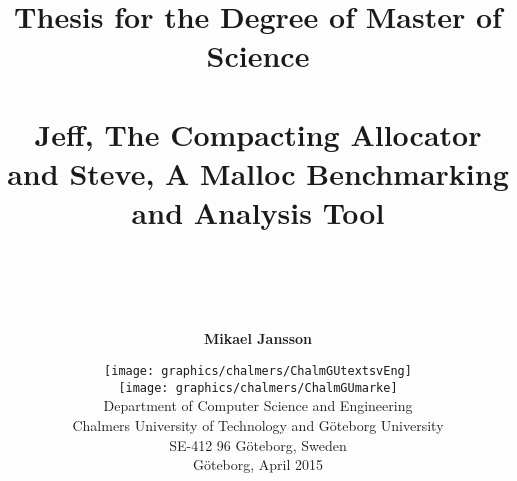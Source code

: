 \begin{titlepage}
\thispagestyle{empty}

\title{{\Large Thesis for the Degree of Master of Science}
     \\ ~
     \\ \bf Jeff, The Compacting Allocator and Steve, A Malloc Benchmarking and Analysis Tool
     \\ ~
     \\ ~
      }

\author{\Large \bf Mikael Jansson}

\date{
  \enlargethispage{2.1\baselineskip}
  \texttt{[image: graphics/chalmers/ChalmGUtextsvEng]} \\
  \vspace{5mm}
  \texttt{[image: graphics/chalmers/ChalmGUmarke]} \\
  \vspace{12mm}
  Department of Computer Science and Engineering \\
  Chalmers University of Technology
    and G\"{o}teborg University \\
  SE-412 96 G\"{o}teborg, Sweden \\
  \vspace{12mm}
  G{\"o}teborg, April 2015
}

\end{titlepage}

\maketitle

\newpage{}
\thispagestyle{empty}
\mbox{}

\noindent

